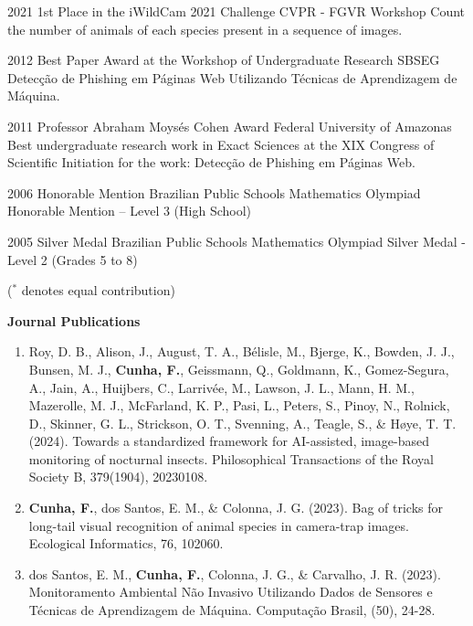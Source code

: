 \documentclass[10pt]{developercv} %
\begin{document}
\begin{entrylist}
  \entry
  {2021}
  {1st Place in the iWildCam 2021 Challenge}
  {CVPR - FGVR Workshop}
  {Count the number of animals of each species present in a sequence of images.}

  \entry
  {2012}
  {Best Paper Award at the Workshop of Undergraduate Research}
  {SBSEG}
  {Detecção de Phishing em Páginas Web Utilizando Técnicas de Aprendizagem de
Máquina.}

  \entry
  {2011}
  {Professor Abraham Moysés Cohen Award}
  {Federal University of Amazonas}
  {Best undergraduate research work in Exact Sciences at the XIX Congress of
Scientific Initiation for the work: Detecção de Phishing em Páginas Web.}

\entry
  {2006}
  {Honorable Mention}
  {Brazilian Public Schools Mathematics Olympiad}
  {Honorable Mention – Level 3 (High School)}

\entry
  {2005}
  {Silver Medal}
  {Brazilian Public Schools Mathematics Olympiad}
  {Silver Medal - Level 2 (Grades 5 to 8)}


\end{entrylist}


($^\ast$ denotes equal contribution)
\vspace{0.3cm}

\textbf{Journal Publications}

\begin{enumerate}
 \item Roy, D. B., Alison, J., August, T. A., Bélisle, M., Bjerge, K., Bowden,
J. J., Bunsen, M. J., \textbf{Cunha, F.}, Geissmann, Q., Goldmann, K.,
Gomez-Segura, A., Jain, A., Huijbers, C., Larrivée, M., Lawson, J. L., Mann, H.
M., Mazerolle, M. J., McFarland, K. P., Pasi, L., Peters, S., Pinoy, N.,
Rolnick, D., Skinner, G. L., Strickson, O. T., Svenning, A., Teagle, S., \&
Høye, T. T. (2024). Towards a standardized framework for AI-assisted,
image-based monitoring of nocturnal insects. Philosophical Transactions of the
Royal Society B, 379(1904), 20230108.

 \item \textbf{Cunha, F.}, dos Santos, E. M., \& Colonna, J. G. (2023). Bag of
tricks for long-tail visual recognition of animal species in camera-trap
images. Ecological Informatics, 76, 102060.

 \item dos Santos, E. M., \textbf{Cunha, F.}, Colonna, J. G., \& Carvalho, J.
R. (2023). Monitoramento Ambiental Não Invasivo Utilizando Dados de Sensores e
Técnicas de Aprendizagem de Máquina. Computação Brasil, (50), 24-28.\\

\end{enumerate}
\end{document}
